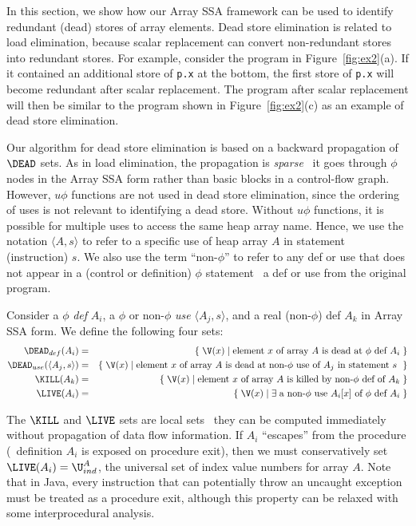 In this section, we show how our Array SSA framework can be used to
identify redundant (dead) stores of array elements.  Dead store
elimination is related to load elimination, because scalar
replacement can convert non-redundant stores into redundant stores.
For example, consider the program in
Figure~\ref{fig:ex2}(a).  If it contained an additional
store of {\tt p.x} at the bottom, the first store of {\tt p.x} will
become redundant after scalar replacement.  The program after scalar
replacement will then be similar to the program shown in
Figure~\ref{fig:ex2}(c) as an example of dead
store elimination.

Our algorithm for dead store elimination is based on a backward
propagation of $\DEAD$ sets.  As in load elimination,
the propagation is {\it sparse} \ie\ it goes through $\phi$ nodes in
the Array SSA form rather than basic blocks in a control-flow graph.
However, $u\phi$ functions are not used in
dead store elimination, since the ordering of uses is not relevant
to identifying a dead store.
Without $u\phi$ functions, it is possible for
multiple uses to access the same heap array name.
Hence, we use the notation $\langle A,s \rangle$
to refer to a specific use of
heap array $A$ in statement (instruction) $s$.
We also
use the term ``non-$\phi$'' to refer to any def or use that does not
appear in a (control or definition)
$\phi$ statement \ie\ a def or use from the original program.

Consider a $\phi$ {\it def} $A_i$, a $\phi$ or non-$\phi$ {\it use} $\langle A_j, s \rangle$, and a real
(non-$\phi$) def $A_k$ in Array SSA form.  We define the following
four sets:
\begin{eqnarray*}
\DEAD_{def}(A_i) & = & \{\; \V(x) \; | \; 
\mbox{element $x$ of array $A$ is dead at $\phi$ def $A_i$} \;\} \\
\DEAD_{use}(\langle A_j,s \rangle) & = & \{\; \V(x) \; | \; 
\mbox{element $x$ of array $A$ is dead at non-$\phi$ use of $A_j$ in statement $s$ } \;\} \\
\KILL(A_k) & = & \{\; \V(x) \;|\; \mbox{element $x$ of array $A$ is killed by
non-$\phi$ def of $A_k$} \;\}\\
\LIVE(A_i) & = & \{ \; \V(x) \;| \; \exists \; \mbox{a non-$\phi$ use $A_i[x]$ of
$\phi$ def $A_i$}\;\}
\end{eqnarray*}

The $\KILL$ and $\LIVE$ sets are local sets \ie\ they can be computed 
immediately
without propagation of data flow information.
If $A_i$ ``escapes'' from the procedure (\ie\ definition
$A_i$ is exposed on procedure exit), then we must conservatively
set $\LIVE(A_i) = \U^A_{ind}$, the universal set of index value numbers
for array $A$.  Note that in Java, every instruction that can potentially
throw an uncaught exception must be treated as a procedure exit, although this
property can be relaxed with some interprocedural analysis.

